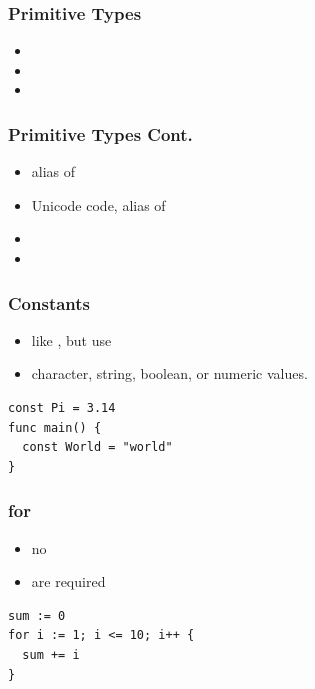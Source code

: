 \documentclass[xetex,mathserif,serif,12pt]{beamer}
\begin{document}
\begin{frame}

  \frametitle{Primitive Types}

  \begin{itemize}
  \item {}
  \item {}
  \item
            \newline
        \newline
  \end{itemize}

\end{frame}

\begin{frame}

  \frametitle{Primitive Types Cont.}

  \begin{itemize}
  \item {} alias of 
  \item {} Unicode code, alias of 
  \item {} 
  \item {} 
  \end{itemize}
\end{frame}

\begin{frame}[fragile]
  \frametitle{Constants}

  \begin{itemize}
  \item like , but use 
  \item character, string, boolean, or numeric values.
  \end{itemize}

  \begin{beamer@nomargin}
    \begin{lstlisting}
const Pi = 3.14
func main() {
  const World = "world"
}
    \end{lstlisting}
  \end{beamer@nomargin}
\end{frame}

\begin{frame}[fragile]
  \frametitle{\ttfamily for}

  \begin{itemize}
  \item no \hltexttt{(} \hltexttt{)}
  \item \hltexttt{\}} \hltexttt{\}} are required
  \end{itemize}

  \begin{beamer@nomargin}
    \begin{lstlisting}
sum := 0
for i := 1; i <= 10; i++ {
  sum += i
}
    \end{lstlisting}
  \end{beamer@nomargin}
\end{frame}
\end{document}
